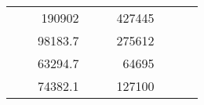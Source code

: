 \begin{table}[H]
\begin{tabular}{|ccrccrccc}
\multicolumn{1}{|c|}{\cellcolor[HTML]{FFFFC7}}                                & \multicolumn{1}{c|}{\cellcolor[HTML]{DDFDFF}}                      & \multicolumn{1}{r|}{\cellcolor[HTML]{DAE8FC}190902}    & \multicolumn{1}{c|}{\cellcolor[HTML]{FFFFC7}}                                & \multicolumn{1}{c|}{\cellcolor[HTML]{DDFDFF}}                       & \multicolumn{1}{r|}{\cellcolor[HTML]{DDFDFF}427445}    &                                                                              &                                                                    &                                                        \\ \cline{3-3} \cline{6-6}
\multicolumn{1}{|c|}{\cellcolor[HTML]{FFFFC7}}                                & \multicolumn{1}{c|}{\cellcolor[HTML]{DDFDFF}}                      & \multicolumn{1}{r|}{\cellcolor[HTML]{DDFDFF}98183.7}   & \multicolumn{1}{c|}{\cellcolor[HTML]{FFFFC7}}                                & \multicolumn{1}{c|}{\cellcolor[HTML]{DDFDFF}}                       & \multicolumn{1}{r|}{\cellcolor[HTML]{DAE8FC}275612}    &                                                                              &                                                                    &                                                        \\ \cline{3-3} \cline{6-6}
\multicolumn{1}{|c|}{\cellcolor[HTML]{FFFFC7}}                                & \multicolumn{1}{c|}{\cellcolor[HTML]{DDFDFF}}                      & \multicolumn{1}{r|}{\cellcolor[HTML]{DAE8FC}63294.7}   & \multicolumn{1}{c|}{\cellcolor[HTML]{FFFFC7}}                                & \multicolumn{1}{c|}{\cellcolor[HTML]{DDFDFF}}                       & \multicolumn{1}{r|}{\cellcolor[HTML]{DDFDFF}64695}     &                                                                              &                                                                    &                                                        \\ \cline{3-3} \cline{6-6}
\multicolumn{1}{|c|}{\cellcolor[HTML]{FFFFC7}}                                & \multicolumn{1}{c|}{\cellcolor[HTML]{DDFDFF}}                      & \multicolumn{1}{r|}{\cellcolor[HTML]{DDFDFF}74382.1}   & \multicolumn{1}{c|}{\cellcolor[HTML]{FFFFC7}}                                & \multicolumn{1}{c|}{\cellcolor[HTML]{DDFDFF}}                       & \multicolumn{1}{r|}{\cellcolor[HTML]{DAE8FC}127100}    &                                                                              &                                                                    &                                                        \\ \cline{3-3} \cline{6-6}

\end{tabular}
\end{table}
